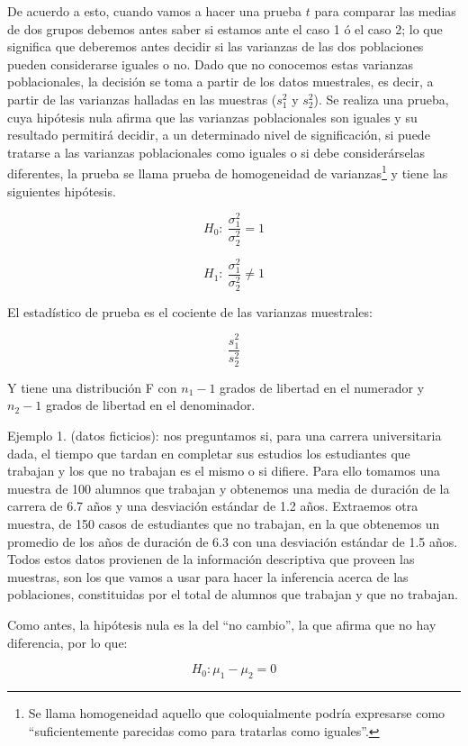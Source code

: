 \documentclass[]{book}
\let\rmarkdownfootnote\footnote%
\def\footnote{\protect\rmarkdownfootnote}
\begin{document}
De acuerdo a esto, cuando vamos a hacer una prueba \(t\) para comparar las medias de dos grupos debemos antes saber si estamos ante el caso 1 ó el caso 2; lo que significa que deberemos antes decidir si las varianzas de las dos poblaciones pueden considerarse iguales o no. Dado que no conocemos estas varianzas poblacionales, la decisión se toma a partir de los datos muestrales, es decir, a partir de las varianzas halladas en las muestras (\(s_{1}^{2}\) y \(s_{2}^{2}\)). Se realiza una prueba, cuya hipótesis nula afirma que las varianzas poblacionales son iguales y su resultado permitirá decidir, a un determinado nivel de significación, si puede tratarse a las varianzas poblacionales como iguales o si debe considerárselas diferentes, la prueba se llama prueba de homogeneidad de varianzas\footnote{Se llama homogeneidad aquello que coloquialmente podría expresarse como ``suficientemente parecidas como para tratarlas como iguales''.} y tiene las siguientes hipótesis.

\[H_{0}:\ \frac{\sigma_{1}^{2}}{\sigma_{2}^{2}} = 1\]

\[H_{1}:\ \frac{\sigma_{1}^{2}}{\sigma_{2}^{2}} \neq 1\]

El estadístico de prueba es el cociente de las varianzas muestrales:

\[\frac{s_{1}^{2}}{s_{2}^{2}}\]

Y tiene una distribución F con \(n_{1} - 1\) grados de libertad en el
numerador y \(n_{2} - 1\) grados de libertad en el denominador.

Ejemplo 1. (datos ficticios): nos preguntamos si, para una carrera
universitaria dada, el tiempo que tardan en completar sus estudios los
estudiantes que trabajan y los que no trabajan es el mismo o si difiere.
Para ello tomamos una muestra de 100 alumnos que trabajan y obtenemos
una media de duración de la carrera de 6.7 años y una desviación
estándar de 1.2 años. Extraemos otra muestra, de 150 casos de
estudiantes que no trabajan, en la que obtenemos un promedio de los años de duración de 6.3 con una desviación estándar de 1.5 años. Todos estos datos provienen de la información descriptiva que proveen las muestras, son los que vamos a usar para hacer la inferencia acerca de las
poblaciones, constituidas por el total de alumnos que trabajan y que no
trabajan.

Como antes, la hipótesis nula es la del ``no cambio'', la que afirma que
no hay diferencia, por lo que:

\[H_{0}:\mu_{1} - \mu_{2} = 0\]
\end{document}
